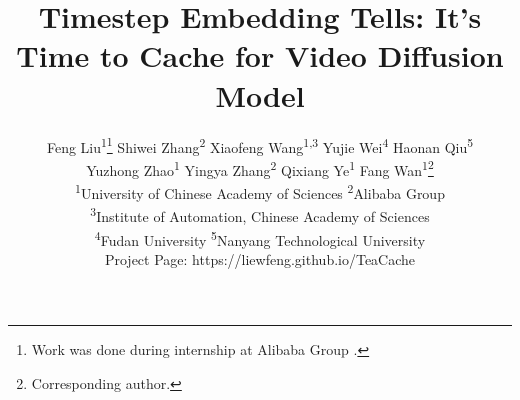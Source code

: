 \documentclass[10pt,twocolumn,letterpaper]{article}
\title{Timestep Embedding Tells: It's Time to Cache for Video Diffusion Model}
\author{Feng Liu\textsuperscript{1}\thanks{Work was done during internship at Alibaba Group
.}\quad 
Shiwei Zhang\textsuperscript{2}\quad
Xiaofeng Wang\textsuperscript{1,3}\quad
Yujie Wei\textsuperscript{4}\quad
Haonan Qiu\textsuperscript{5}\\
Yuzhong Zhao\textsuperscript{1}\quad
Yingya Zhang\textsuperscript{2}\quad
Qixiang Ye\textsuperscript{1}\quad
Fang Wan\textsuperscript{1}\thanks{Corresponding author.}\\
\textsuperscript{1}University of Chinese Academy of Sciences
\quad
\textsuperscript{2}Alibaba Group\\
\textsuperscript{3}Institute of Automation, Chinese Academy of Sciences\\
\textsuperscript{4}Fudan University\quad
\textsuperscript{5}Nanyang Technological University\\
Project Page: {\color{magenta}https://liewfeng.github.io/TeaCache}}
\begin{document}
\maketitle
    





{
    \small
    
    
}
\end{document}

